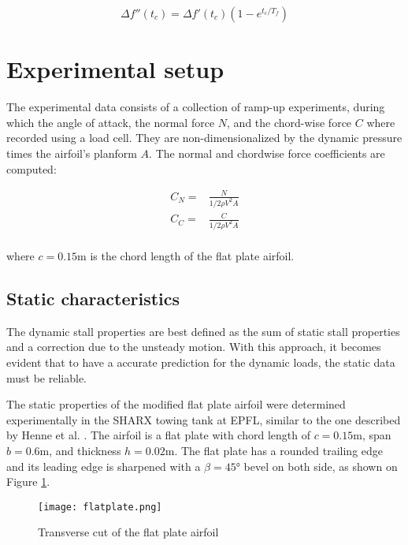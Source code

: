 \begin{equation}
	\Delta f''(t_c) = \Delta f'(t_c)(1-e^{t_c/T_f})
	\label{eq:fpp_sheng}
\end{equation}



\section{Experimental setup}
\label{section:exp_setup}
The experimental data consists of a collection of ramp-up experiments, during which the angle of attack, the normal force $N$, and the chord-wise force $C$ where recorded using a load cell. They are non-dimensionalized by the dynamic pressure times the airfoil's planform $A$. The normal and chordwise force coefficients are computed: 

\begin{eqnarray}
	C_N =& \frac{N}{1/2 \rho V^2 A} \\
	C_C =& \frac{C}{1/2 \rho V^2 A} \\
	\label{eq:force_coeffs}
\end{eqnarray}

\noindent where $c=0.15\si{\meter}$ is the chord length of the flat plate airfoil. 

\subsection{Static characteristics}

The dynamic stall properties are best defined as the sum of static stall properties and a correction due to the unsteady motion. With this approach, it becomes evident that to have a accurate prediction for the dynamic loads, the static data must be reliable. 


The static properties of the modified flat plate airfoil were determined experimentally in the SHARX towing tank at EPFL, similar to the one described by Henne et al. \cite{henne_dynamic_2018}. The airfoil is a flat plate with chord length of $c=0.15 \si{\meter}$, span $b=0.6 \si{\meter}$, and thickness $h=0.02 \si{\meter}$. The flat plate has a rounded trailing edge and its leading edge is sharpened with a $\beta = \ang{45}$ bevel on both side, as shown on Figure \ref{fig:flatplate}.

\begin{figure}[h]
	\centering
	\texttt{[image: flatplate.png]}
	\caption{Transverse cut of the flat plate airfoil}
	\label{fig:flatplate}
\end{figure}

